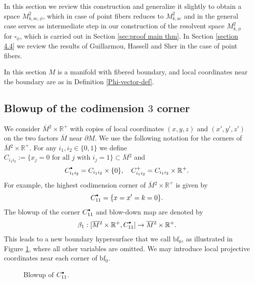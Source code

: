 \documentclass[11pt]{article}
\numberwithin{equation}{section}
\newcommand{\bbullet}{{\scriptscriptstyle\bullet}}
\newcommand{\sbullet}{{\raisebox{1pt}{$\bbullet$}}}
\theoremstyle{plain}
\theoremstyle{definition}
\newcommand{\R}{{\mathbb{R}}}
\newcommand{\lf}{{\mathrm{lb}}}
\newcommand{\rf}{{\mathrm{rb}}}
\newcommand{\bbf}{{\mathrm{bf}}}
\newcommand{\bfz}{{\bbf_0}}
\newcommand{\ssc}{{\mathrm{sc}}}
\newcommand{\zf}{{\mathrm{zf}}}
\newcommand{\Mbar}{{\overline{M}}}\let\M\Mbar
\begin{document}
In this section we review this construction and generalize it slightly to obtain a space $M^2_{k,\ssc,\phi}$, which in case of point fibers reduces to $M^2_{k,\ssc}$ and in the general case serves as intermediate step in our construction of the resolvent space $M^2_{k,\phi}$ for $\square_\phi$, which is carried out in Section \ref{sec:proof main thm}.
In Section \ref{section 4.4} we review the results of Guillarmou, Hassell and Sher in the case of point fibers.

In this section $M$ is a manifold with fibered boundary, and local coordinates near the boundary are as in Definition \ref{Phi-vector-def}.

\subsection{Blowup of the codimension $3$ corner}
We consider $\Mbar{}^2 \times \R^+$ with copies of local
coordinates $(x,y,z)$ and $(x',y',z')$ on the two factors $\Mbar$ near $\partial M$.
We use the following notation for the corners of $\Mbar{}^2\times \R^+$.
For any $i_1,i_2 \in \{0,1\}$ we define
$
C_{i_1i_2} := \{x_j = 0 \text{ for all $j$ with } i_j = 1\} \subset \Mbar{}^2
$
and
\[
C_{i_1i_2}^\sbullet = C_{i_1i_2}\times \{0\},\quad C_{i_1i_2}^+ = C_{i_1i_2} \times \R^+.
\]
For example, the highest codimension corner of $\Mbar{}^2\times \R^+$ is given by
\[
C_{11}^\sbullet = \{ x = x' = k =0\}.
\]
The blowup of the corner $C_{11}^\sbullet$ and blow-down map are denoted by
\[
\beta_1:[\Mbar{}^2 \times \R^+, C_{11}^\sbullet]\to \Mbar{}^2 \times \R^+.
\]
This leads to a new boundary hypersurface that we call $\bfz$, as illustrated in Figure
\ref{figure 4}, where all other variables are omitted. We may introduce local projective coordinates near
each corner of $\bfz$.

\begin{figure}[htb]
\centering
{}
\caption{ Blowup of $C_{11}^\sbullet$.} \label{figure 4}
\end{figure}
\end{document}
